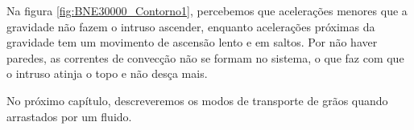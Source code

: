     Na figura \ref{fig:BNE30000_Contorno1}, percebemos que acelerações menores que a gravidade não fazem o intruso ascender, enquanto acelerações próximas da gravidade tem um movimento de ascensão lento e em saltos. Por não haver paredes, as correntes de convecção não se formam no sistema, o que faz com que o intruso atinja o topo e não desça mais.


    No próximo capítulo, descreveremos os modos de transporte de grãos quando arrastados por um fluido.

